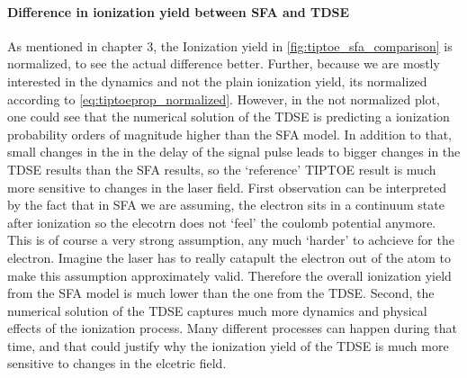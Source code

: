 \paragraph{Difference in ionization yield between SFA and TDSE}
As mentioned in chapter 3, the Ionization yield in \ref{fig:tiptoe_sfa_comparison} is normalized, to see the actual difference better.
Further, because we are mostly interested in the dynamics and not the plain ionization yield, its normalized according to \eqref{eq:tiptoeprop_normalized}.
However, in the not normalized plot, one could see that the numerical solution of the TDSE is predicting a ionization probability orders of magnitude higher than the SFA model.
In addition to that, small changes in the in the delay of the signal pulse leads to bigger changes in the TDSE results than the SFA results, so the `reference' TIPTOE result is much more sensitive to changes in the laser field.
First observation can be interpreted by the fact that in SFA we are assuming, the electron sits in a continuum state after ionization so the elecotrn does not `feel' the coulomb potential anymore.
This is of course a very strong assumption, any much `harder' to achcieve for the electron. 
Imagine the laser has to really catapult the electron out of the atom to make this assumption approximately valid.
Therefore the overall ionization yield from the SFA model is much lower than the one from the TDSE.
Second, the numerical solution of the TDSE captures much more dynamics and physical effects of the ionization process.
Many different processes can happen during that time, and that could justify why the ionization yield of the TDSE is much more sensitive to changes in the elcetric field.

